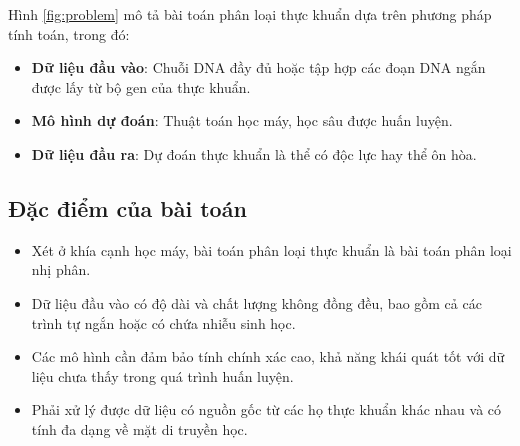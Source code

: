 Hình \ref{fig:problem} mô tả bài toán phân loại thực khuẩn dựa trên phương pháp tính toán, trong đó:
\begin{itemize}
    \item \textbf{Dữ liệu đầu vào}: Chuỗi DNA đầy đủ hoặc tập hợp các đoạn DNA ngắn được lấy từ bộ gen của thực khuẩn.
    \item \textbf{Mô hình dự đoán}: Thuật toán học máy, học sâu được huấn luyện.
    \item \textbf{Dữ liệu đầu ra}: Dự đoán thực khuẩn là thể có độc lực hay thể ôn hòa.
\end{itemize}

\subsection{Đặc điểm của bài toán}

\begin{itemize}
    \item Xét ở khía cạnh học máy, bài toán phân loại thực khuẩn là bài toán phân loại nhị phân.
    \item Dữ liệu đầu vào có độ dài và chất lượng không đồng đều, bao gồm cả các trình tự ngắn hoặc có chứa nhiễu sinh học.
    \item Các mô hình cần đảm bảo tính chính xác cao, khả năng khái quát tốt với dữ liệu chưa thấy trong quá trình huấn luyện.
    \item Phải xử lý được dữ liệu có nguồn gốc từ các họ thực khuẩn khác nhau và có tính đa dạng về mặt di truyền học.
\end{itemize}

